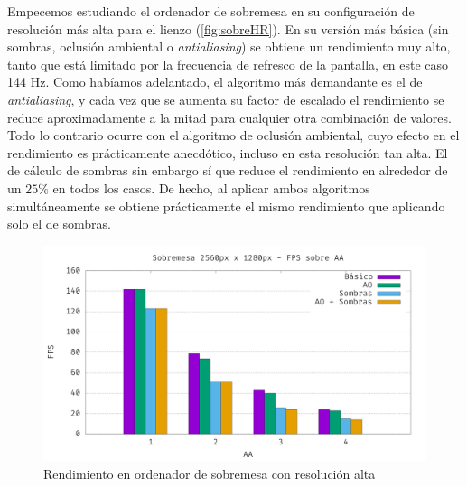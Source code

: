 Empecemos estudiando el ordenador de sobremesa en su configuración de resolución más alta para el lienzo (\autoref{fig:sobreHR}). En su versión más básica (sin sombras, oclusión ambiental o \textit{antialiasing}) se obtiene un rendimiento muy alto, tanto que está limitado por la frecuencia de refresco de la pantalla, en este caso 144 Hz. Como habíamos adelantado, el algoritmo más demandante es el de \textit{antialiasing}, y cada vez que se aumenta su factor de escalado el rendimiento se reduce aproximadamente a la mitad para cualquier otra combinación de valores. Todo lo contrario ocurre con el algoritmo de oclusión ambiental, cuyo efecto en el rendimiento es prácticamente anecdótico, incluso en esta resolución tan alta. El de cálculo de sombras sin embargo sí que reduce el rendimiento en alrededor de un $25\%$ en todos los casos. De hecho, al aplicar ambos algoritmos simultáneamente se obtiene prácticamente el mismo rendimiento que aplicando solo el de sombras.
\begin{figure}[ht!]
    \centering
    \includegraphics[width=\textwidth]{Plantilla-TFG-master/img/graficas/SobremesaHR.png}
    \caption{Rendimiento en ordenador de sobremesa con resolución alta}
    \label{fig:sobreHR}
\end{figure}

